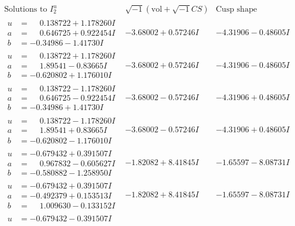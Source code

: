 \documentclass[1p]{elsarticle_modified}
\theoremstyle{definition}
\newcommand{\I}{\sqrt{-1}}
\begin{document}
$$\begin{array}{c|c|c}  
\text{Solutions to }I^u_{2}& \I (\text{vol} + \sqrt{-1}CS) & \text{Cusp shape}\\
 \hline 
\begin{aligned}
u &= \phantom{-}0.138722 + 1.178260 I \\
a &= \phantom{-}0.646725 + 0.922454 I \\
b &= -0.34986 - 1.41730 I\end{aligned}
 & -3.68002 + 0.57246 I & -4.31906 - 0.48605 I \\ \hline\begin{aligned}
u &= \phantom{-}0.138722 + 1.178260 I \\
a &= \phantom{-}1.89541 - 0.83665 I \\
b &= -0.620802 + 1.176010 I\end{aligned}
 & -3.68002 + 0.57246 I & -4.31906 - 0.48605 I \\ \hline\begin{aligned}
u &= \phantom{-}0.138722 - 1.178260 I \\
a &= \phantom{-}0.646725 - 0.922454 I \\
b &= -0.34986 + 1.41730 I\end{aligned}
 & -3.68002 - 0.57246 I & -4.31906 + 0.48605 I \\ \hline\begin{aligned}
u &= \phantom{-}0.138722 - 1.178260 I \\
a &= \phantom{-}1.89541 + 0.83665 I \\
b &= -0.620802 - 1.176010 I\end{aligned}
 & -3.68002 - 0.57246 I & -4.31906 + 0.48605 I \\ \hline\begin{aligned}
u &= -0.679432 + 0.391507 I \\
a &= \phantom{-}0.967832 - 0.605627 I \\
b &= -0.580882 - 1.258950 I\end{aligned}
 & -1.82082 + 8.41845 I & -1.65597 - 8.08731 I \\ \hline\begin{aligned}
u &= -0.679432 + 0.391507 I \\
a &= -0.492379 + 0.153513 I \\
b &= \phantom{-}1.009630 - 0.133152 I\end{aligned}
 & -1.82082 + 8.41845 I & -1.65597 - 8.08731 I \\ \hline\begin{aligned}
u &= -0.679432 - 0.391507 I \\

\end{aligned}
\end{array}$$
\end{document}
